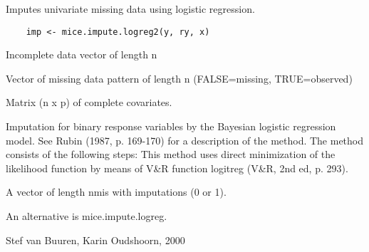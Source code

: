 \documentclass{article}
\begin{document}
\begin{Description}\relax
Imputes univariate missing data using logistic regression.
\end{Description}
\begin{Usage}
\begin{verbatim}
    imp <- mice.impute.logreg2(y, ry, x)
\end{verbatim}
\end{Usage}
\begin{Arguments}
\begin{ldescription}
\item[\code{y}] Incomplete data vector of length n
\item[\code{ry}] Vector of missing data pattern of length n (FALSE=missing,
TRUE=observed)
\item[\code{x}] Matrix (n x p) of complete covariates.

\end{ldescription}
\end{Arguments}
\begin{Details}\relax
Imputation for binary response variables by the Bayesian 
logistic regression model. See Rubin (1987, p. 169-170) for
a description of the method.
The method consists of the following steps:
This method uses direct minimization of the likelihood function
by means of V\&R function logitreg (V\&R, 2nd ed, p. 293).
\end{Details}
\begin{Value}
\begin{ldescription}
\item[\code{imp}] A vector of length nmis with imputations (0 or 1).
\end{ldescription}
\end{Value}
\begin{Note}\relax
An alternative is mice.impute.logreg.
\end{Note}
\begin{Author}\relax
Stef van Buuren, Karin Oudshoorn, 2000
\end{Author}
\end{document}
